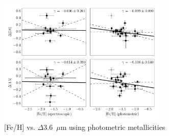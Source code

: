\documentclass[a4paper,fleqn,usenatbib]{mnras}
\begin{document}
\begin{figure}
\begin{center}
\includegraphics[width=80mm]{final_plots/delta_feh_specphot_theo.pdf}
\caption{[Fe/H] vs. $\Delta$3.6~$\mu$m using photometric metallicities}
\label{fig:delta_3p6_phot}
\end{center}
\end{figure}
\end{document}
